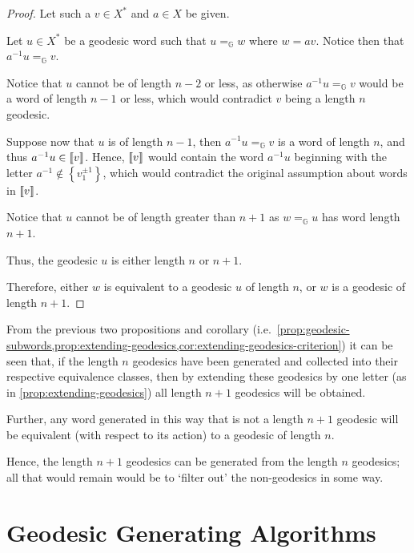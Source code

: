 \begin{proof}
	Let such a $v \in X^\ast$ and $a \in X$ be given.
	
	Let $u \in X^\ast$ be a geodesic word such that $u =_\mathbb{G} w$ where $w = av$.
	Notice then that $a^{-1} u =_\mathbb{G} v$.
	
	Notice that $u$ cannot be of length $n-2$ or less, as otherwise $a^{-1}u =_\mathbb{G} v$ would be a word of length $n-1$ or less, which would contradict $v$ being a length $n$ geodesic.
	
	Suppose now that $u$ is of length $n-1$, then $a^{-1}u =_\mathbb{G} v$ is a word of length $n$, and thus $a^{-1} u \in \left\llbracket v \right\rrbracket$.
	Hence, $\left\llbracket v \right\rrbracket$ would contain the word $a^{-1} u$ beginning with the letter $a^{-1}\notin\left\lbrace v_1^{\pm 1} \right\rbrace$, which would contradict the original assumption about words in $\left\llbracket v \right\rrbracket$.
	
	Notice that $u$ cannot be of length greater than $n+1$ as $w =_\mathbb{G} u$ has word length $n+1$.
	
	Thus, the geodesic $u$ is either length $n$ or $n+1$.

	Therefore, either $w$ is equivalent to a geodesic $u$ of length $n$, or $w$ is a geodesic of length $n+1$.
\end{proof}

\begin{remark}
	\label{rmk:genrated-next-geodesics}
	From the previous two propositions and corollary (i.e.\  \cref{prop:geodesic-subwords,prop:extending-geodesics,cor:extending-geodesics-criterion}) it can be seen that, if the length $n$ geodesics have been generated and collected into their respective equivalence classes, then by extending these geodesics by one letter (as in \cref{prop:extending-geodesics}) all length $n+1$ geodesics will be obtained.
	
	Further, any word generated in this way that is not a length $n+1$ geodesic will be equivalent (with respect to its action) to a geodesic of length $n$.
	
	Hence, the length $n+1$ geodesics can be generated from the length $n$ geodesics; all that would remain would be to `filter out' the non-geodesics in some way.
\end{remark}


\section{Geodesic Generating Algorithms}
\label{sec:generating-geodesics}

